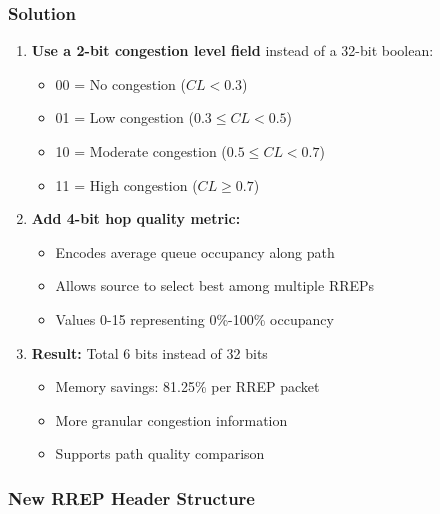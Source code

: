 \documentclass[12pt,a4paper]{article}
\begin{document}
\subsubsection{Solution}
\begin{enumerate}
    \item \textbf{Use a 2-bit congestion level field} instead of a 32-bit boolean:
    \begin{itemize}
        \item 00 = No congestion ($CL < 0.3$)
        \item 01 = Low congestion ($0.3 \leq CL < 0.5$)
        \item 10 = Moderate congestion ($0.5 \leq CL < 0.7$)
        \item 11 = High congestion ($CL \geq 0.7$)
    \end{itemize}


    \item \textbf{Add 4-bit hop quality metric:}
    \begin{itemize}
        \item Encodes average queue occupancy along path
        \item Allows source to select best among multiple RREPs
        \item Values 0-15 representing 0\%-100\% occupancy
    \end{itemize}
    
    \item \textbf{Result:} Total 6 bits instead of 32 bits
    \begin{itemize}
        \item Memory savings: 81.25\% per RREP packet
        \item More granular congestion information
        \item Supports path quality comparison
    \end{itemize}
\end{enumerate}

\subsubsection{New RREP Header Structure}

    
    
\end{document}
